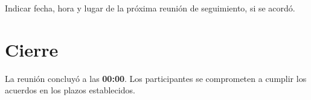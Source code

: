 \documentclass{../base/canon}
\begin{document}
\begin{ObservationBox}
  Indicar fecha, hora y lugar de la próxima reunión de seguimiento, si se acordó.
\end{ObservationBox}

\section{Cierre}

La reunión concluyó a las \textbf{00:00}. Los participantes se comprometen a
cumplir los acuerdos en los plazos establecidos.

\vspace{10pt}
\noindent
\begin{minipage}{0.45\linewidth}
\end{minipage}
\hfill
\begin{minipage}{0.45\linewidth}
\end{minipage}

\ContactSignature
\end{document}
